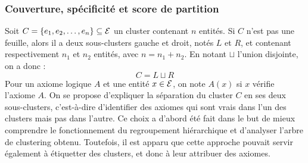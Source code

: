 \subsubsection{Couverture, spécificité et score de partition}
Soit $C = \{e_1, e_2, \ldots, e_n \} \subseteq \mathcal{E}$ un cluster contenant $n$ entités. Si $C$ n'est pas une feuille, alors il a deux sous-clusters gauche et droit, notés $L$ et $R$, et contenant respectivement $n_1$ et $n_2$ entités, avec $n = n_1 + n_2$. En notant $\sqcup$ l'union disjointe, on a donc :
\begin{equation}
C = L \sqcup R
\end{equation}
Pour un axiome logique $A$ et une entité $x \in \mathcal{E}$, on note $A(x)$ si $x$ vérifie l'axiome $A$. On se propose d'expliquer la séparation du cluster $C$ en ses deux sous-clusters, c'est-à-dire d'identifier des axiomes qui sont vrais dans l'un des clusters mais pas dans l'autre. Ce choix a d'abord été fait dans le but de mieux comprendre le fonctionnement du regroupement hiérarchique et d'analyser l'arbre de clustering obtenu. Toutefois, il est apparu que cette approche pouvait servir également à étiquetter des clusters, et donc à leur attribuer des axiomes.

